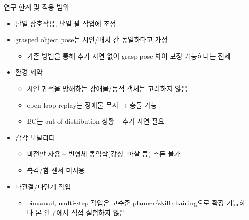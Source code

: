 \documentclass[aspectratio=169]{beamer}
\begin{document}
\begin{frame}{연구 한계 및 적용 범위}
  \small
  \begin{itemize}
    \item 단일 상호작용, 단일 팔 작업에 초점
    \item grasped object pose는 시연/배치 간 동일하다고 가정
    \begin{itemize}
      \item 기존 방법을 통해 추가 시연 없이 grasp pose 차이 보정 가능하다는 전제
    \end{itemize}
    \item 환경 제약
    \begin{itemize}
      \item 시연 궤적을 방해하는 장애물/동적 객체는 고려하지 않음
      \item open-loop replay는 장애물 무시 → 충돌 가능
      \item BC는 out-of-distribution 상황 – 추가 시연 필요
    \end{itemize}
    \item 감각 모달리티
    \begin{itemize}
      \item 비전만 사용 – 변형체 동역학(강성, 마찰 등) 추론 불가
      \item 촉각/힘 센서 미사용
    \end{itemize}
    \item 다관절/다단계 작업
    \begin{itemize}
      \item bimanual, multi-step 작업은 고수준 planner/skill chaining으로 확장 가능하나 본 연구에서 직접 실험하지 않음
    \end{itemize}
  \end{itemize}
\end{frame}
\end{document}
